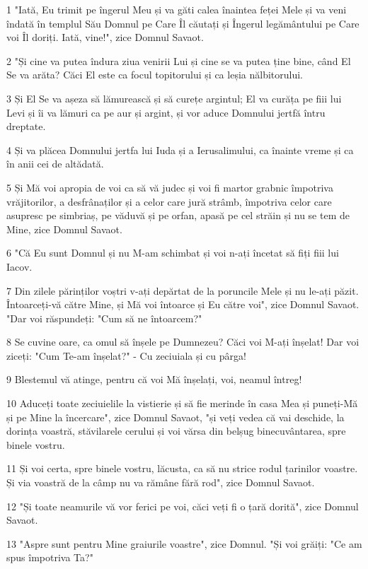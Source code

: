 \par 1 "Iată, Eu trimit pe îngerul Meu și va găti calea înaintea feței Mele și va veni îndată în templul Său Domnul pe Care Îl căutați și Îngerul legământului pe Care voi Îl doriți. Iată, vine!", zice Domnul Savaot.
\par 2 "Și cine va putea îndura ziua venirii Lui și cine se va putea ține bine, când El Se va arăta? Căci El este ca focul topitorului și ca leșia nălbitorului.
\par 3 Și El Se va așeza să lămurească și să curețe argintul; El va curăța pe fiii lui Levi și îi va lămuri ca pe aur și argint, și vor aduce Domnului jertfă întru dreptate.
\par 4 Și va plăcea Domnului jertfa lui Iuda și a Ierusalimului, ca înainte vreme și ca în anii cei de altădată.
\par 5 Și Mă voi apropia de voi ca să vă judec și voi fi martor grabnic împotriva vrăjitorilor, a desfrânaților și a celor care jură strâmb, împotriva celor care asupresc pe simbriaș, pe văduvă și pe orfan, apasă pe cel străin și nu se tem de Mine, zice Domnul Savaot.
\par 6 "Că Eu sunt Domnul și nu M-am schimbat și voi n-ați încetat să fiți fiii lui Iacov.
\par 7 Din zilele părinților voștri v-ați depărtat de la poruncile Mele și nu le-ați păzit. Întoarceți-vă către Mine, și Mă voi întoarce și Eu către voi", zice Domnul Savaot. "Dar voi răspundeți: "Cum să ne întoarcem?"
\par 8 Se cuvine oare, ca omul să înșele pe Dumnezeu? Căci voi M-ați înșelat! Dar voi ziceți: "Cum Te-am înșelat?" - Cu zeciuiala și cu pârga!
\par 9 Blestemul vă atinge, pentru că voi Mă înșelați, voi, neamul întreg!
\par 10 Aduceți toate zeciuielile la vistierie și să fie merinde în casa Mea și puneți-Mă și pe Mine la încercare", zice Domnul Savaot, "și veți vedea că vai deschide, la dorința voastră, stăvilarele cerului și voi vărsa din belșug binecuvântarea, spre binele vostru.
\par 11 Și voi certa, spre binele vostru, lăcusta, ca să nu strice rodul țarinilor voastre. Și via voastră de la câmp nu va rămâne fără rod", zice Domnul Savaot.
\par 12 "Și toate neamurile vă vor ferici pe voi, căci veți fi o țară dorită", zice Domnul Savaot.
\par 13 "Aspre sunt pentru Mine graiurile voastre", zice Domnul. "Și voi grăiți: "Ce am spus împotriva Ta?"
